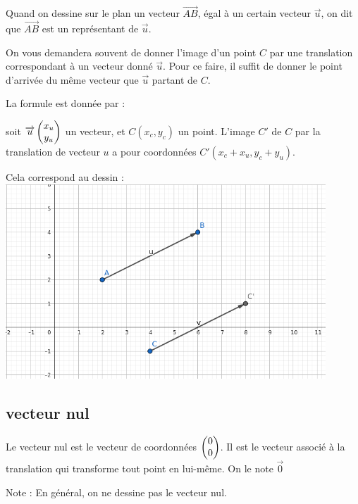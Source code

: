 \documentclass[10pt,a4paper,oneside]{book}
\begin{document}
Quand on dessine sur le plan un vecteur $\overrightarrow{AB}$, égal à un certain vecteur $\overrightarrow{u}$, on dit que $\overrightarrow{AB}$ est un représentant de $\overrightarrow{u}$.

On vous demandera souvent de donner l'image d'un point $C$ par une translation correspondant à un vecteur donné $\overrightarrow{u}$. Pour ce faire, il suffit de donner le point d'arrivée du même vecteur que $\overrightarrow{u}$ partant de $C$.


\begin{minipage}{0.5\textwidth}

La formule est donnée par :

soit $\overrightarrow{u}  \begin{pmatrix} x_u\\ y_u \end{pmatrix}$ un vecteur, et $C(x_c,y_c)$ un point. L'image $C'$ de $C$ par la translation de vecteur $u$ a pour coordonnées $C'(x_c+x_u, y_c+ y_u)$.

\end{minipage}
\begin{minipage}{0.45\textwidth}
  Cela correspond au dessin :
    \centering
    \includegraphics[width=0.9\textwidth]{Vecteurs_C+u.png} 

\end{minipage}



\subsection{vecteur nul}

\begin{de}
    Le vecteur nul est le vecteur de coordonnées $ \begin{pmatrix} 0\\ 0 \end{pmatrix}$. Il est le vecteur associé à la translation qui transforme tout point en lui-même. On le note $\overrightarrow{0}$
\end{de}

Note : En général, on ne dessine pas le vecteur nul.
\end{document}
